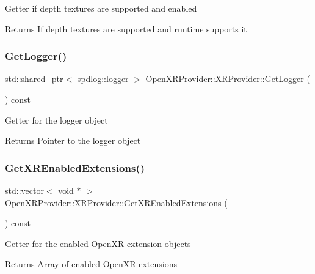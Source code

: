 Getter if depth textures are supported and enabled \begin{DoxyReturn}{Returns}
If depth textures are supported and runtime supports it 
\end{DoxyReturn}
\mbox{\label{class_open_x_r_provider_1_1_x_r_provider_a985813ed6da86367d311836533466f7b}} 
\subsubsection{\texorpdfstring{GetLogger()}{GetLogger()}}
{\footnotesize\ttfamily std\+::shared\+\_\+ptr$<$ spdlog\+::logger $>$ Open\+X\+R\+Provider\+::\+X\+R\+Provider\+::\+Get\+Logger (\begin{DoxyParamCaption}{ }\end{DoxyParamCaption}) const\hspace{0.3cm}{\ttfamily [inline]}}

Getter for the logger object \begin{DoxyReturn}{Returns}
Pointer to the logger object 
\end{DoxyReturn}
\mbox{\label{class_open_x_r_provider_1_1_x_r_provider_adcfd16c34593dd486444db07f5a6d6b8}} 
\subsubsection{\texorpdfstring{GetXREnabledExtensions()}{GetXREnabledExtensions()}}
{\footnotesize\ttfamily std\+::vector$<$ void $\ast$ $>$ Open\+X\+R\+Provider\+::\+X\+R\+Provider\+::\+Get\+X\+R\+Enabled\+Extensions (\begin{DoxyParamCaption}{ }\end{DoxyParamCaption}) const\hspace{0.3cm}{\ttfamily [inline]}}

Getter for the enabled Open\+XR extension objects \begin{DoxyReturn}{Returns}
Array of enabled Open\+XR extensions 
\end{DoxyReturn}
\mbox{\label{class_open_x_r_provider_1_1_x_r_provider_a86abca051fdf068a7f4a0e4d8f57095e}} 
